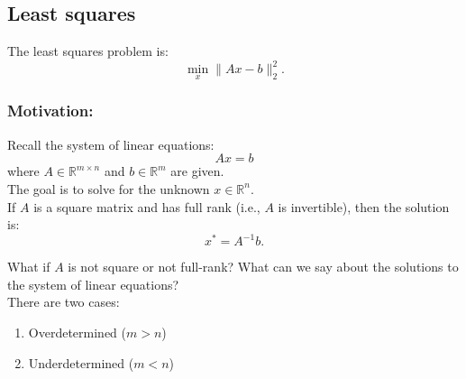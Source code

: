 \subsection{Least squares}
\begin{definition}
    The least squares problem is:
    \[
    \min_x \|Ax - b\|_2^2.
    \]
\end{definition}

\subsubsection{Motivation:}
\begin{intuition}
    Recall the system of linear equations: 
    \[
    A x = b
    \]
    where $A \in \mathbb{R}^{m \times n}$ and $b \in \mathbb{R}^m$ are given. \\

    The goal is to solve for the unknown $x \in \mathbb{R}^n$. \\

    If $A$ is a square matrix and has full rank (i.e., $A$ is invertible), then the solution is:
    \[
    x^* = A^{-1}b.
    \]

    What if $A$ is not square or not full-rank? What can we say about the solutions to the system of linear equations? \\

    There are two cases:
    \begin{enumerate}
        \item Overdetermined ($m > n$)
        \item Underdetermined ($m < n$)
    \end{enumerate}
\end{intuition}

